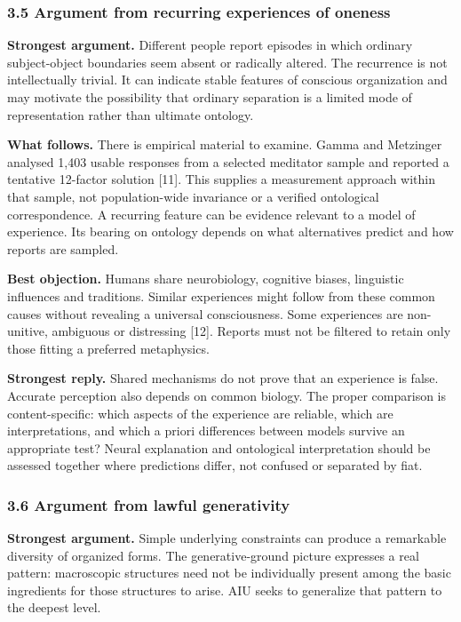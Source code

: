 \documentclass[
  10pt,
  a4paper,
]{article}
\begin{document}
\subsubsection{3.5 Argument from recurring experiences of
oneness}\label{argument-from-recurring-experiences-of-oneness}

\textbf{Strongest argument.} Different people report episodes in which
ordinary subject-object boundaries seem absent or radically altered. The
recurrence is not intellectually trivial. It can indicate stable
features of conscious organization and may motivate the possibility that
ordinary separation is a limited mode of representation rather than
ultimate ontology.

\textbf{What follows.} There is empirical material to examine. Gamma and
Metzinger analysed 1,403 usable responses from a selected meditator
sample and reported a tentative 12-factor solution {[}11{]}. This
supplies a measurement approach within that sample, not population-wide
invariance or a verified ontological correspondence. A recurring feature
can be evidence relevant to a model of experience. Its bearing on
ontology depends on what alternatives predict and how reports are
sampled.

\textbf{Best objection.} Humans share neurobiology, cognitive biases,
linguistic influences and traditions. Similar experiences might follow
from these common causes without revealing a universal consciousness.
Some experiences are non-unitive, ambiguous or distressing {[}12{]}.
Reports must not be filtered to retain only those fitting a preferred
metaphysics.

\textbf{Strongest reply.} Shared mechanisms do not prove that an
experience is false. Accurate perception also depends on common biology.
The proper comparison is content-specific: which aspects of the
experience are reliable, which are interpretations, and which a priori
differences between models survive an appropriate test? Neural
explanation and ontological interpretation should be assessed together
where predictions differ, not confused or separated by fiat.

\subsubsection{3.6 Argument from lawful
generativity}\label{argument-from-lawful-generativity}

\textbf{Strongest argument.} Simple underlying constraints can produce a
remarkable diversity of organized forms. The generative-ground picture
expresses a real pattern: macroscopic structures need not be
individually present among the basic ingredients for those structures to
arise. AIU seeks to generalize that pattern to the deepest level.
\end{document}
